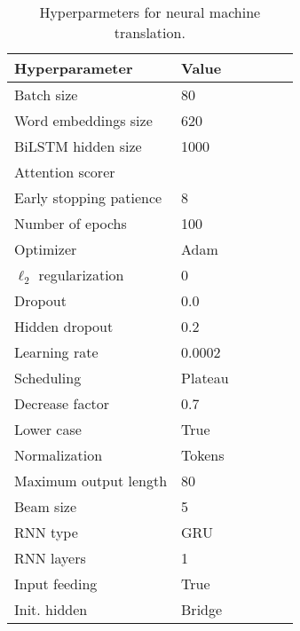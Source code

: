 \documentclass{article}
\begin{document}
\begin{comment}
For the continuous attention models, we used the combined attention setting described above, with 30 Gaussian RBFs and $\tilde{\mu}$ linearly spaced in $[0,1]$ and $\tilde{\sigma} \in \{.03, .1, .3\}$.
\end{comment}

\begin{table}[t]
    \caption{Hyperparmeters for neural machine translation.}
    \label{tab:table_all_hyperparams_nmt}
    \begin{small}
    \begin{center}
    \begin{tabular}{llllll}
        \toprule
        \sc Hyperparameter & \sc Value  \\
        \midrule
        Batch size                  & 80    \\
        Word embeddings size        & 620     \\
        BiLSTM hidden size          & 1000     \\
        Attention scorer            & \citep{bahdanau2014neural}     \\
        Early stopping patience & 8 \\
        Number of epochs            & 100     \\
        Optimizer                   & Adam      \\
        $\ell_2$ regularization     & 0     \\
        Dropout & 0.0 \\
        Hidden dropout & 0.2 \\
        Learning rate               & 0.0002     \\
        Scheduling & Plateau \\
        Decrease factor & 0.7 \\
        Lower case & True \\
        Normalization & Tokens \\
        Maximum output length & 80 \\
        Beam size & 5 \\
        RNN type & GRU \\
        RNN layers & 1 \\
        Input feeding & True \\
        Init. hidden & Bridge \\
        \bottomrule
    \end{tabular}
    \end{center}
    \end{small}
    \vskip -0.1in
\end{table}
\end{document}
